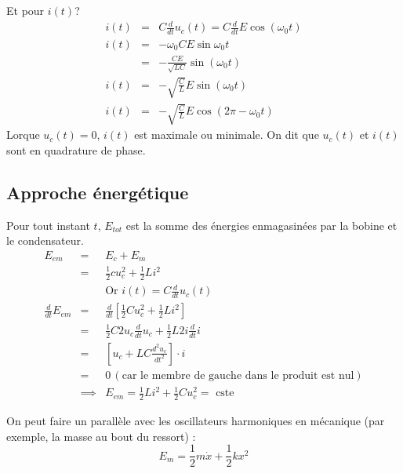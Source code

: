 
Et pour \(i(t)\)?\\
\begin{eqnarray*}
    i(t) &=& C \frac{d}{dt}u_{c}(t) = C \frac{d}{dt}E\cos (\omega _{0}t)\\
    i(t) &=& -\omega_{0}CE\sin \omega_{0}t\\
     &=& -\frac{CE}{\sqrt{LC}} \sin(\omega _{0}t) \\
     i(t) &=& -\sqrt{\frac{C}{L}}E\sin (\omega_{0}t)\\
     i(t) &=& -\sqrt{\frac{C}{L}}E\cos(2\pi-\omega_{0}t) 
\end{eqnarray*}
Lorque \(u_{c}(t) = 0\), \(i(t)\) est maximale ou minimale. On dit que \(u_{c}(t)\) et \(i(t)\) sont en quadrature de phase. 

\subsection{Approche énergétique}

Pour tout instant \(t\), \(E_{tot}\) est la somme des énergies enmagasinées par la bobine et le condensateur.\\
\begin{eqnarray*}
    E_{em} &=& E_{c} + E_{m}\\
    &=& \frac{1}{2}cu_{c}^{2} + \frac{1}{2}Li^{2}\\
    &&\text{Or }i(t) = C\frac{d}{dt}u_{c}(t)\\
    \frac{d}{dt}E_{em} &=& \frac{d}{dt}\left[ \frac{1}{2}Cu_{c}^{2} + \frac{1}{2}Li^{2} \right]\\
    &=& \frac{1}{2} C 2u_{c}\frac{d}{dt}u_{c} + \frac{1}{2}L 2 i \frac{d}{dt}i\\
    &=& \left[ u_{c} + LC \frac{d^{2}u_{c}}{dt^{2}} \right] \cdot i\\
    &=& 0 \,(\text{car le membre de gauche dans le produit est nul})\\
    & \implies& E_{em} = \frac{1}{2}Li^{2} + \frac{1}{2}Cu_{c}^{2} = \text{ cste}
\end{eqnarray*}

\begin{remark}
    On peut faire un parallèle avec les oscillateurs harmoniques en mécanique (par exemple, la masse au bout du ressort) : \\
    \[
        E_{m} = \frac{1}{2}m \dot{x} + \frac{1}{2}kx^{2}
    \]
\end{remark}

